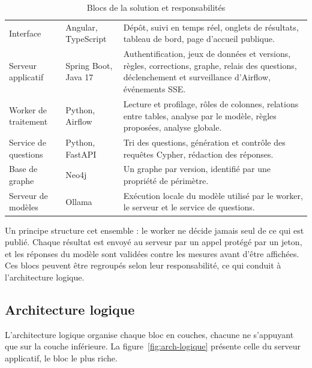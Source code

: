 \begin{table}[H]
\centering
\small
\begin{tabular}{|L{3.2cm}|L{3.2cm}|L{7.6cm}|}
\hline
{} &  &  \\ \hline
Interface & Angular, TypeScript & Dépôt, suivi en temps réel, onglets de résultats, tableau de bord, page d'accueil publique. \\ \hline
Serveur applicatif & Spring Boot, Java 17 & Authentification, jeux de données et versions, règles, corrections, graphe, relais des questions, déclenchement et surveillance d'Airflow, événements SSE. \\ \hline
Worker de traitement & Python, Airflow & Lecture et profilage, rôles de colonnes, relations entre tables, analyse par le modèle, règles proposées, analyse globale. \\ \hline
Service de questions & Python, FastAPI & Tri des questions, génération et contrôle des requêtes Cypher, rédaction des réponses. \\ \hline
Base de graphe & Neo4j & Un graphe par version, identifié par une propriété de périmètre. \\ \hline
Serveur de modèles & Ollama & Exécution locale du modèle utilisé par le worker, le serveur et le service de questions. \\ \hline
\end{tabular}
\caption{Blocs de la solution et responsabilités}
\label{tab:blocs}
\end{table}

Un principe structure cet ensemble : le worker ne décide jamais seul de ce qui est publié. Chaque résultat est envoyé au serveur par un appel protégé par un jeton, et les réponses du modèle sont validées contre les mesures avant d'être affichées. Ces blocs peuvent être regroupés selon leur responsabilité, ce qui conduit à l'architecture logique.

\subsection{Architecture logique}

L'architecture logique organise chaque bloc en couches, chacune ne s'appuyant que sur la couche inférieure. La figure~\ref{fig:arch-logique} présente celle du serveur applicatif, le bloc le plus riche.


